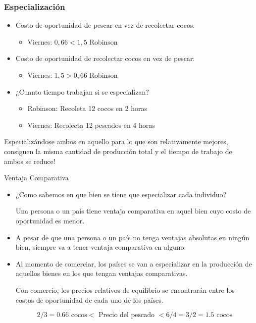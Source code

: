\documentclass{beamer}
\begin{document}
\begin{frame}
\frametitle{Especialización}
    \begin{itemize}
        \item Costo de oportunidad de pescar en vez de recolectar cocos:
            \begin{itemize}
            \item Viernes: $ 0,66 < 1,5 $ Robinson 
            \end{itemize}
        \item Costo de oportunidad de recolectar cocos en vez de pescar:
            \begin{itemize}
            \item Viernes: $ 1,5 > 0,66 $ Robinson 
            \end{itemize}
        \item ¿Cuanto tiempo trabajan si se especializan?
            \begin{itemize}
            \item Robinson: Recoleta 12 cocos en 2 horas
            \item Viernes: Recolecta 12 pescados en 4 horas
            \end{itemize}
    \end{itemize}
    \begin{boxA}
        \centering
        Especializándose ambos en aquello para lo que
        son relativamente mejores, consiguen la misma cantidad de producción
        total y el tiempo de trabajo de ambos se reduce!
    \end{boxA}
\end{frame}

\begin{frame}{Ventaja Comparativa}
    \begin{itemize}
        \item ¿Como sabemos en que bien se tiene que especializar cada individuo?
        \begin{boxA}
            \centering
            Una persona o un país tiene ventaja comparativa en aquel bien
            cuyo costo de oportunidad es menor.
        \end{boxA}
        \item A pesar de que una persona o un país no tenga ventajas absolutas en ningún bien,
        siempre va a tener ventaja comparativa en alguno. 
        \item Al momento de comerciar, los países se van a especializar en la
        producción de aquellos bienes en los que tengan ventajas
        comparativas.
        \begin{boxA}
            \centering
            Con comercio, los precios relativos de equilibrio se encontrarán
            entre los costos de oportunidad de cada uno de los países.
        \end{boxA}
        \vspace{-4mm}
        \begin{equation*}
            2/3 = 0.66 \text{ cocos} < \text{ Precio del pescado } < 6/4 = 3/2 = 1.5 \text{ cocos}
        \end{equation*}
    \end{itemize}
\end{frame}
\end{document}
